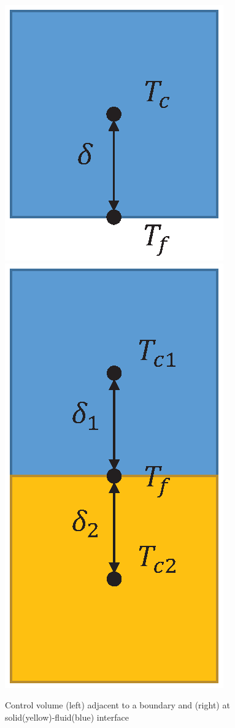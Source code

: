 \begin{figure}[h]
\centering
\includegraphics[scale=0.5]{openfoam/CV1.eps}
\includegraphics[scale=0.5]{openfoam/CV.eps}
\caption{Control volume (left) adjacent to a boundary and (right) at solid(yellow)-fluid(blue) interface}
\label{fig:CV}
\end{figure}


